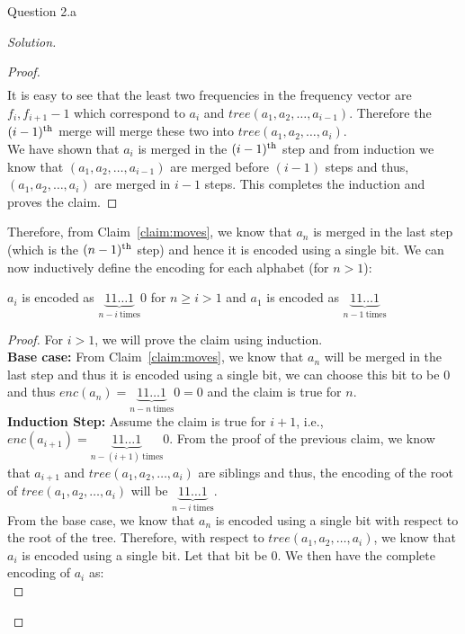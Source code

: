 \begin{solution}{Question 2.a}
\begin{proof}[Solution]
\begin{proof}
\begin{equation}
\begin{split}
                \end{split}
            \end{equation}
            It is easy to see that the least two frequencies in the frequency vector are $f_i, f_{i+1}-1$ which correspond to $a_i$ and $tree(a_1, a_2, \ldots, a_{i-1})$. Therefore the $(i-1)\textsuperscript{th}$ merge will merge these two into $tree(a_1, a_2, \ldots, a_{i})$.\\
            We have shown that $a_i$ is merged in the $(i-1)\textsuperscript{th}$ step and from induction we know that $(a_1, a_2, \ldots, a_{i-1})$ are merged before $(i-1)$ steps and thus, $(a_1, a_2, \ldots, a_i)$ are merged in $i-1$ steps. This completes the induction and proves the claim.
        \end{proof}
        Therefore, from Claim~\ref{claim:moves}, we know that $a_n$ is merged in the last step (which is the $(n-1)\textsuperscript{th}$ step) and hence it is encoded using a single bit. We can now inductively define the encoding for each alphabet (for $n>1$):
        \begin{claim}\label{claim:fibhufans}
            $a_i$ is encoded as $\underbrace{11\ldots1}_{n-i\ \text{times}}0$ for $n\geq i>1$ and $a_1$ is encoded as $\underbrace{11\ldots1}_{n-1\ \text{times}}$
        \end{claim}
        \begin{proof}
            For $i>1$, we will prove the claim using induction.\\
            \textbf{Base case:} From Claim~\ref{claim:moves}, we know that $a_n$ will be merged in the last step and thus it is encoded using a single bit, we can choose this bit to be $0$ and thus $enc(a_n)=\underbrace{11\ldots1}_{n-n\ \text{times}}0=0$ and the claim is true for $n$.\\
            \textbf{Induction Step:} Assume the claim is true for $i+1$, i.e., $enc(a_{i+1})=\underbrace{11\ldots1}_{n-(i+1)\ \text{times}}0$. From the proof of the previous claim, we know that $a_{i+1}$ and $tree(a_1, a_2, \ldots, a_i)$ are siblings and thus, the encoding of the root of $tree(a_1, a_2, \ldots, a_i)$ will be $\underbrace{11\ldots1}_{n-i\ \text{times}}$.\\
            From the base case, we know that $a_n$ is encoded using a single bit with respect to the root of the tree. Therefore, with respect to $tree(a_1, a_2, \ldots, a_i)$, we know that $a_i$ is encoded using a single bit. Let that bit be $0$. We then have the complete encoding of $a_i$ as:
            \begin{equation}

\end{equation}
\end{proof}
\end{proof}
\end{solution}
